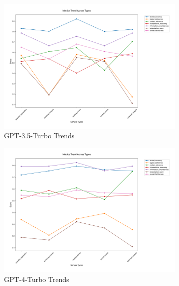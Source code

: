 \begin{figure}[!htbp]
\centering
\begin{subfigure}{0.3\textwidth}
    \includegraphics[width=\textwidth]{figures/overall/metrics_trend_gpt-3.5-turbo.png}
    \caption{GPT-3.5-Turbo Trends}
    \label{fig:metrics_trend_gpt35}
\end{subfigure}
\begin{subfigure}{0.3\textwidth}
    \includegraphics[width=\textwidth]{figures/overall/metrics_trend_gpt-4-turbo.png}
    \caption{GPT-4-Turbo Trends}
    \label{fig:metrics_trend_gpt4t}
\end{subfigure}
\begin{subfigure}{0.3\textwidth}

\end{subfigure}
\end{figure}
